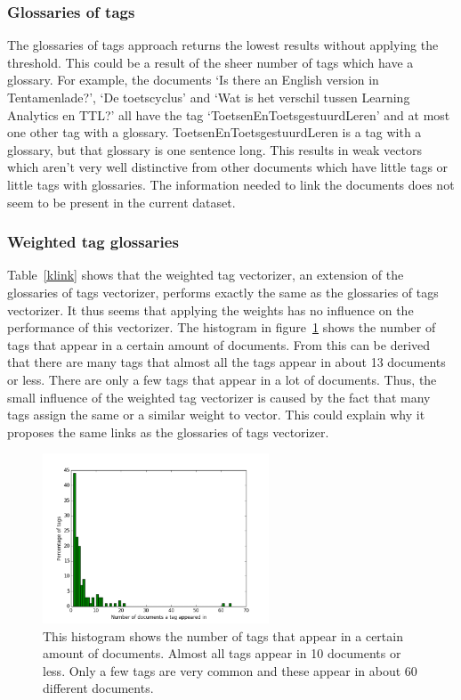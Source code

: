 \subsubsection{Glossaries of tags}
The glossaries of tags approach returns the lowest results without applying the
threshold. This could be a result of the sheer number of tags which have a glossary. For
example, the documents `Is there an English version in Tentamenlade?', `De toetscyclus' 
and `Wat is het verschil tussen Learning Analytics en TTL?' all have the 
tag `ToetsenEnToetsgestuurdLeren' and at most one other tag with a glossary. 
ToetsenEnToetsgestuurdLeren is a tag with a glossary, but that glossary is one sentence 
long. This results in weak vectors which aren't very well distinctive from other documents 
which have little tags or little tags with glossaries. The information needed to link the 
documents does not seem to be present in the current dataset.

\subsubsection{Weighted tag glossaries}
Table~\ref{klink} shows that the weighted tag vectorizer, an extension of the glossaries of tags vectorizer, performs exactly the same as the glossaries of tags vectorizer. It thus seems that applying the weights has no influence on the performance of this vectorizer. The histogram in figure~\ref{weightedtag} shows the number of tags that appear in a certain amount of documents. From this can be derived that there are many tags that almost all the tags appear in about 13 documents or less. There are only a few tags that appear in a lot of documents. Thus, the small influence of the weighted tag vectorizer is caused by the fact that many tags assign the same or a similar weight to vector. This could explain why it proposes the same links as the glossaries of tags vectorizer.  

\begin{figure}
\center
\includegraphics[width =0.6\textwidth]{images/weightedtagexplanation}
\caption{This histogram shows the number of tags that appear in a certain amount of documents. Almost all tags appear in 10 documents or less. Only a few tags are very common and these appear in about 60 different documents.}
\label{weightedtag}
\end{figure}

